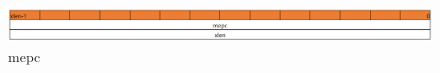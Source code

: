 \begin{figure}[H] %
    \centering %
    \includegraphics[width=1.0\textwidth]{figs/mepc.png} %
    \caption{mepc} %
    \label{Fig.6} %
\end{figure}








